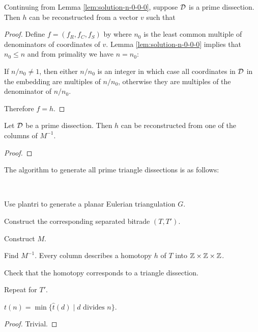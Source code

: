 \begin{cor}
Continuing from Lemma \ref{lem:solution-n-0-0-0}, suppose $\mathcal D$ is a prime dissection. Then $h$ can be reconstructed from a vector $v$ such that
%
\end{cor}
\begin{proof}
Define $f = (f_R, f_C, f_S)$ by
%
where $n_0$ is the least common multiple of denominators of coordinates of $v$. Lemma \ref{lem:solution-n-0-0-0} implies that $n_0 \leq n$ and from primality we have $n = n_0$:

If $n/n_0 \ne 1$, then either $n/n_0$ is an integer in which case all coordinates in $\mathcal D$ in the embedding are multiples of $n/n_0$, otherwise they are multiples of the denominator of $n/n_0$.

Therefore $f=h$.
\end{proof}

\begin{lem}
Let $\mathcal D$ be a prime dissection. Then $h$ can be reconstructed from one of the columns of $M^{-1}$.
\end{lem}%
\begin{proof}
\end{proof}


The algorithm to generate all prime triangle dissections is as follows:

\begin{alg}\ 
\begin{cosyenumerate}
	\item Use plantri to generate a planar Eulerian triangulation $G$.
	\item Construct the corresponding separated bitrade $(T,T')$.
	\item Construct $M$.
	\item Find $M^{-1}$. Every column describes a homotopy $h$ of $T$ into $\mathbb Z\times\mathbb Z\times\mathbb Z$.
	\item Check that the homotopy corresponds to a triangle dissection.
	\item Repeat for $T'$.
\end{cosyenumerate}
\end{alg}%

\begin{lem}
$t(n) = \min \{\hat t(d) \mid d \mbox{ divides } n\}$.
\end{lem}
\begin{proof}
Trivial.
\end{proof}



